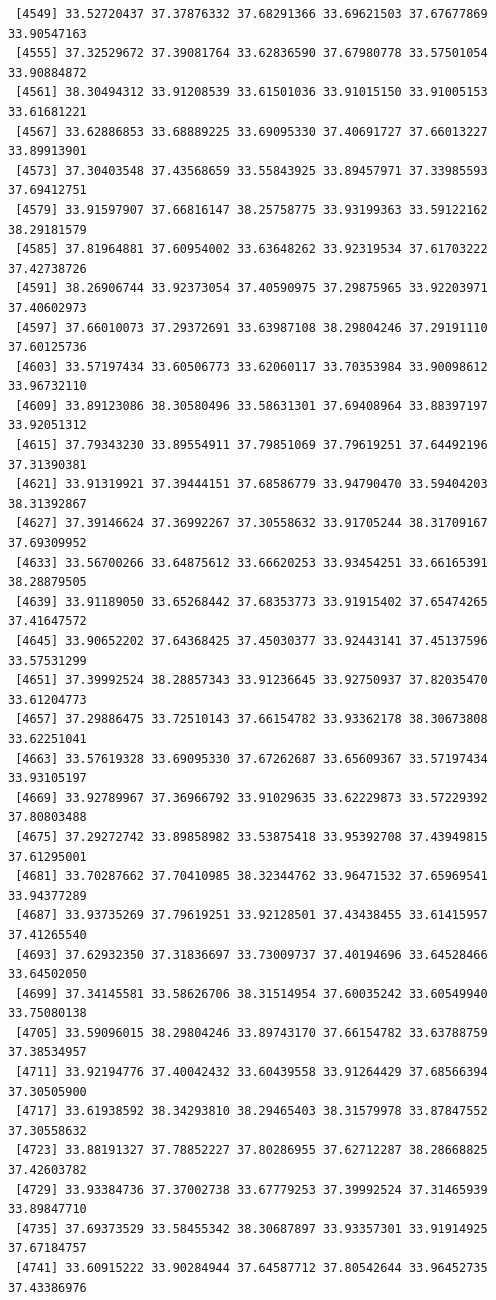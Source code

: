 \documentclass[
  letterpaper,
  DIV=11,
  numbers=noendperiod]{scrartcl}
\begin{document}
\begin{verbatim}
 [4549] 33.52720437 37.37876332 37.68291366 33.69621503 37.67677869 33.90547163
 [4555] 37.32529672 37.39081764 33.62836590 37.67980778 33.57501054 33.90884872
 [4561] 38.30494312 33.91208539 33.61501036 33.91015150 33.91005153 33.61681221
 [4567] 33.62886853 33.68889225 33.69095330 37.40691727 37.66013227 33.89913901
 [4573] 37.30403548 37.43568659 33.55843925 33.89457971 37.33985593 37.69412751
 [4579] 33.91597907 37.66816147 38.25758775 33.93199363 33.59122162 38.29181579
 [4585] 37.81964881 37.60954002 33.63648262 33.92319534 37.61703222 37.42738726
 [4591] 38.26906744 33.92373054 37.40590975 37.29875965 33.92203971 37.40602973
 [4597] 37.66010073 37.29372691 33.63987108 38.29804246 37.29191110 37.60125736
 [4603] 33.57197434 33.60506773 33.62060117 33.70353984 33.90098612 33.96732110
 [4609] 33.89123086 38.30580496 33.58631301 37.69408964 33.88397197 33.92051312
 [4615] 37.79343230 33.89554911 37.79851069 37.79619251 37.64492196 37.31390381
 [4621] 33.91319921 37.39444151 37.68586779 33.94790470 33.59404203 38.31392867
 [4627] 37.39146624 37.36992267 37.30558632 33.91705244 38.31709167 37.69309952
 [4633] 33.56700266 33.64875612 33.66620253 33.93454251 33.66165391 38.28879505
 [4639] 33.91189050 33.65268442 37.68353773 33.91915402 37.65474265 37.41647572
 [4645] 33.90652202 37.64368425 37.45030377 33.92443141 37.45137596 33.57531299
 [4651] 37.39992524 38.28857343 33.91236645 33.92750937 37.82035470 33.61204773
 [4657] 37.29886475 33.72510143 37.66154782 33.93362178 38.30673808 33.62251041
 [4663] 33.57619328 33.69095330 37.67262687 33.65609367 33.57197434 33.93105197
 [4669] 33.92789967 37.36966792 33.91029635 33.62229873 33.57229392 37.80803488
 [4675] 37.29272742 33.89858982 33.53875418 33.95392708 37.43949815 37.61295001
 [4681] 33.70287662 37.70410985 38.32344762 33.96471532 37.65969541 33.94377289
 [4687] 33.93735269 37.79619251 33.92128501 37.43438455 33.61415957 37.41265540
 [4693] 37.62932350 37.31836697 33.73009737 37.40194696 33.64528466 33.64502050
 [4699] 37.34145581 33.58626706 38.31514954 37.60035242 33.60549940 33.75080138
 [4705] 33.59096015 38.29804246 33.89743170 37.66154782 33.63788759 37.38534957
 [4711] 33.92194776 37.40042432 33.60439558 33.91264429 37.68566394 37.30505900
 [4717] 33.61938592 38.34293810 38.29465403 38.31579978 33.87847552 37.30558632
 [4723] 33.88191327 37.78852227 37.80286955 37.62712287 38.28668825 37.42603782
 [4729] 33.93384736 37.37002738 33.67779253 37.39992524 37.31465939 33.89847710
 [4735] 37.69373529 33.58455342 38.30687897 33.93357301 33.91914925 37.67184757
 [4741] 33.60915222 33.90284944 37.64587712 37.80542644 33.96452735 37.43386976

\end{verbatim}
\end{document}
